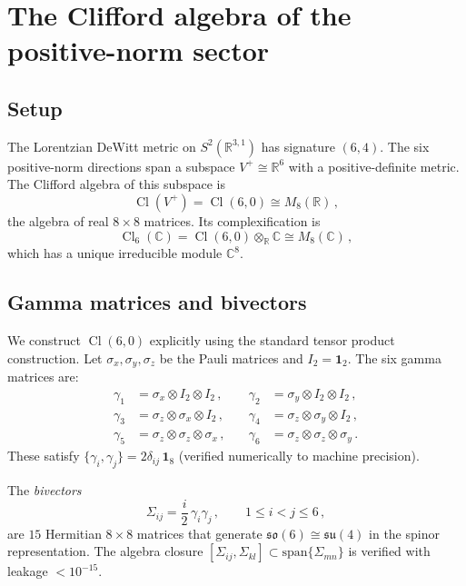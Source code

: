 \documentclass[12pt,a4paper]{article}
\theoremstyle{definition}
\newcommand{\Cl}{\operatorname{Cl}}
\newcommand{\R}{\mathbb{R}}
\newcommand{\C}{\mathbb{C}}
\begin{document}
\section{The Clifford algebra of the positive-norm sector}
\label{sec:clifford}

\subsection{Setup}

The Lorentzian DeWitt metric on $S^2(\R^{3,1})$ has signature $(6,4)$.
The six positive-norm directions span a subspace $V^+ \cong \R^6$ with a positive-definite metric.
The Clifford algebra of this subspace is
\begin{equation}
\Cl(V^+) = \Cl(6,0) \cong M_8(\R)\,,
\end{equation}
the algebra of real $8 \times 8$ matrices.
Its complexification is
\begin{equation}
\Cl_6(\C) = \Cl(6,0) \otimes_\R \C \cong M_8(\C)\,,
\end{equation}
which has a unique irreducible module $\C^8$.

\subsection{Gamma matrices and bivectors}

We construct $\Cl(6,0)$ explicitly using the standard tensor product construction.
Let $\sigma_x, \sigma_y, \sigma_z$ be the Pauli matrices and $I_2 = \mathbf{1}_2$.
The six gamma matrices are:
\begin{equation}
\begin{aligned}
\gamma_1 &= \sigma_x \otimes I_2 \otimes I_2\,, \quad & \gamma_2 &= \sigma_y \otimes I_2 \otimes I_2\,,\\
\gamma_3 &= \sigma_z \otimes \sigma_x \otimes I_2\,, \quad & \gamma_4 &= \sigma_z \otimes \sigma_y \otimes I_2\,,\\
\gamma_5 &= \sigma_z \otimes \sigma_z \otimes \sigma_x\,, \quad & \gamma_6 &= \sigma_z \otimes \sigma_z \otimes \sigma_y\,.
\end{aligned}
\end{equation}
These satisfy $\{\gamma_i, \gamma_j\} = 2\delta_{ij}\, \mathbf{1}_8$ (verified numerically to machine precision).

The \emph{bivectors}
\begin{equation}
\Sigma_{ij} = \frac{i}{2}\, \gamma_i \gamma_j\,, \qquad 1 \le i < j \le 6\,,
\end{equation}
are $15$ Hermitian $8 \times 8$ matrices that generate $\mathfrak{so}(6) \cong \mathfrak{su}(4)$ in the spinor representation.
The algebra closure $[\Sigma_{ij}, \Sigma_{kl}] \subset \mathrm{span}\{\Sigma_{mn}\}$ is verified with leakage $< 10^{-15}$.
\end{document}
